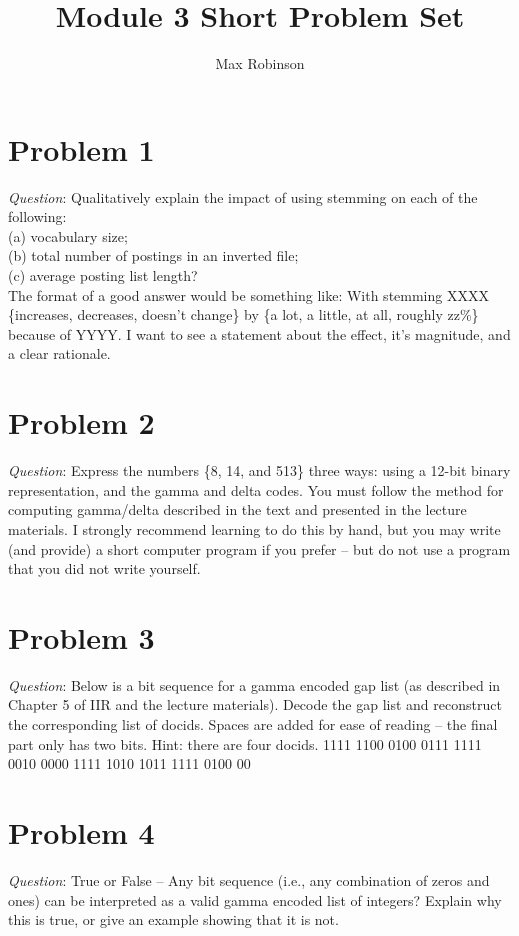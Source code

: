 \documentclass{article}
\begin{document}
\title{Module 3 Short Problem Set}
\author{Max Robinson}
\date{}
\maketitle


\section{Problem 1}
\noindent \textit{Question}: Qualitatively explain the impact of using stemming on each of the following: \\
(a) vocabulary size; \\
(b) total number of postings in an inverted file; \\
(c) average posting list length? \\
The format of a good answer would be something like: With stemming XXXX \{increases, decreases, doesn’t change\} by \{a lot, a little, at all, roughly zz\%\} because of YYYY. I want to see a statement about the effect, it's magnitude, and a clear rationale.





\section{Problem 2}
\noindent \textit{Question}: Express the numbers \{8, 14, and 513\} three ways: using a 12-bit binary representation, and the gamma and
delta codes. You must follow the method for computing gamma/delta described in the text and presented in the lecture
materials. I strongly recommend learning to do this by hand, but you may write (and provide) a short computer
program if you prefer – but do not use a program that you did not write yourself.


\section{Problem 3}
\noindent \textit{Question}: Below is a bit sequence for a gamma encoded gap list (as described in Chapter 5 of IIR and the lecture
materials). Decode the gap list and reconstruct the corresponding list of docids. Spaces are added for ease of reading --
the final part only has two bits. Hint: there are four docids.
1111 1100 0100 0111 1111 0010 0000 1111 1010 1011 1111 0100 00

\section{Problem 4}
\noindent \textit{Question}: True or False -- Any bit sequence (i.e., any combination of zeros and ones) can be interpreted as a valid
gamma encoded list of integers? Explain why this is true, or give an example showing that it is not.
\end{document}
